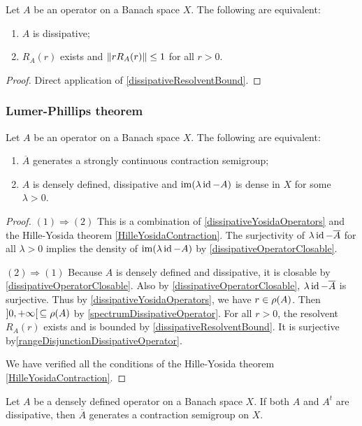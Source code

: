 \begin{lemma} \label{dissipativeYosidaOperators}
Let $A$ be an operator on a Banach space $X$. The following are equivalent:
\begin{enumerate}
\item $A$ is dissipative;
\item $R_A(r)$ exists and $\lVert rR_A(r)\rVert\leq 1$ for all $r>0$.
\end{enumerate}
\end{lemma}
\begin{proof}
Direct application of \ref{dissipativeResolventBound}.
\end{proof}

\subsubsection{Lumer-Phillips theorem}
\begin{theorem}
Let $A$ be an operator on a Banach space $X$. The following are equivalent:
\begin{enumerate}
\item $\overline{A}$ generates a strongly continuous contraction semigroup;
\item $A$ is densely defined, dissipative and $\operatorname{im}(\lambda\operatorname{id}-A)$ is dense in $X$ for some $\lambda > 0$.
\end{enumerate}
\end{theorem}
\begin{proof}
$(1) \Rightarrow (2)$  This is a combination of \ref{dissipativeYosidaOperators} and the Hille-Yosida theorem \ref{HilleYosidaContraction}. The surjectivity of $\lambda\operatorname{id}-\overline{A}$ for all $\lambda > 0$ implies the density of $\operatorname{im}(\lambda\operatorname{id}-A)$ by \ref{dissipativeOperatorClosable}.

$(2) \Rightarrow (1)$ Because $A$ is densely defined and dissipative, it is closable by \ref{dissipativeOperatorClosable}.
Also by \ref{dissipativeOperatorClosable}, $\lambda\operatorname{id}-\overline{A}$ is surjective. Thus by \ref{dissipativeYosidaOperators}, we have $r\in \rho(A)$. Then $]0,+\infty[\,\subseteq \rho(A)$ by \ref{spectrumDissipativeOperator}.
For all $r>0$, the resolvent $R_A(r)$ exists and is bounded by \ref{dissipativeResolventBound}. It is surjective by\ref{rangeDisjunctionDissipativeOperator}.

We have verified all the conditions of the Hille-Yosida theorem \ref{HilleYosidaContraction}.
\end{proof}
\begin{corollary}
Let $A$ be a densely defined operator on a Banach space $X$. If both $A$ and $A^t$ are dissipative, then $\overline{A}$ generates a contraction semigroup on $X$.
\end{corollary}
